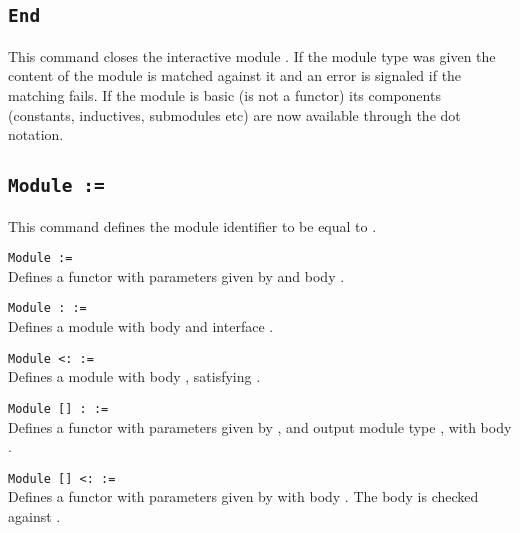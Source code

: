\subsection{\tt End {\ident}}
This command closes the interactive module {\ident}. If the module type
was given the content of the module is matched against it and an error
is signaled if the matching fails. If the module is basic (is not a
functor) its components (constants, inductives, submodules etc) are
now available through the dot notation.

\begin{ErrMsgs}
\item {}
\item {}
\item {}
\end{ErrMsgs}


\subsection{\tt Module {\ident} := {\modexpr}}
This command defines the module identifier {\ident} to be equal to \modexpr.

\begin{Variants}
\item{\tt Module \ident [\modbindings] := {\modexpr}}\\
  Defines a functor with parameters given by {\modbindings} and body \modexpr.
\item{\tt Module {\ident} \verb.:. {\modtype} := {\modexpr}}\\
  Defines a module with body {\modexpr} and interface {\modtype}.
\item{\tt Module {\ident} \verb.<:. {\modtype} := {\modexpr}}\\
  Defines a module with body {\modexpr}, satisfying {\modtype}.
\item{\tt Module {\ident} [\modbindings] \verb.:. {\modtype} := {\modexpr}}\\
  Defines a functor with parameters given by {\modbindings}, and
  output module type {\modtype}, with body {\modexpr}. 
\item{\tt Module {\ident} [\modbindings] \verb.<:. {\modtype} := {\modexpr}}\\
  Defines a functor with parameters given by {\modbindings} with body
  {\modexpr}. The body is checked against {\modtype}.
\end{Variants}

